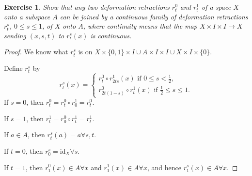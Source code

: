 \documentclass{article}
\newtheorem{exercise}[theorem]{Exercise}
\begin{document}
\begin{exercise}
Show that any two deformation retractions $r_t^0$ and $r_t^1$ of a space $X$ onto a subspace $A$ can be joined by a continuous family of deformation retractions $r_t^s$, $0\leq s\leq 1$, of $X$ onto $A$, where continuity means that the map $X\times I\times I\to X$ sending $(x,s,t)$ to $r_t^s(x)$ is continuous.
\end{exercise}
\begin{proof}
We know what $r_t^s$ is on $X\times\{0,1\}\times I\cup A\times I\times I\cup X\times I\times\{0\}$.

\noindent Define $r_t^s$ by\[r_t^s(x)=\begin{cases}
    r_t^0\circ r_{2ts}^1(x)\text{ if } 0\leq s <\frac{1}{2},\\r_{2t(1-s)}^0\circ r_t^1(x)\text{ if }\frac{1}{2}\leq s\leq 1.
\end{cases}\] If $s=0$, then $r_t^0=r_t^0\circ r_0^1=r_t^0$.

\noindent If $s=1$, then $r_t^1=r_0^0\circ r_t^1=r_t^1$.

\noindent If $a\in A$, then $r_t^s(a)=a\forall s,t$.

\noindent If $t=0$, then $r_0^s=\text{id}_X\forall s$.

\noindent If $t=1$, then $r_1^0(x)\in A\forall x$ and $r_1^1(x)\in A\forall x$, and hence $r_1^s(x)\in A\forall x$.
\end{proof}
\end{document}
